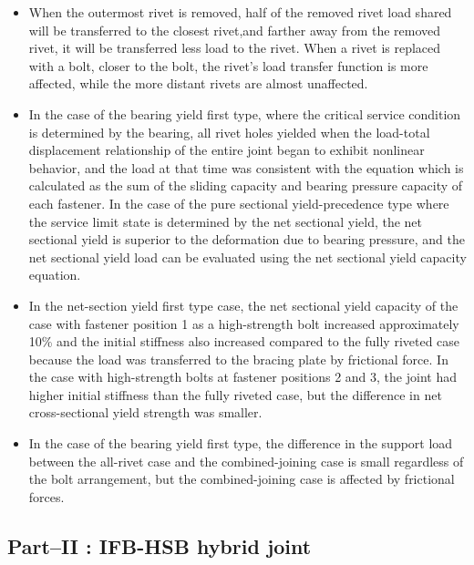 \begin{itemize}

    \item When the outermost rivet is removed, half of the removed rivet load shared will be transferred to the closest rivet,and farther away from the removed rivet, it will be transferred less load to the rivet. When a rivet is replaced with a bolt, closer to the bolt, the rivet's load transfer function is more affected, while the more distant rivets are almost unaffected.

    \item In the case of the bearing yield first type, where the critical service condition is determined by the bearing, all rivet holes yielded when the load-total displacement relationship of the entire joint began to exhibit nonlinear behavior, and the load at that time was consistent with the equation which is calculated as the sum of the sliding capacity and bearing pressure capacity of each fastener. In the case of the pure sectional yield-precedence type where the service limit state is determined by the net sectional yield, the net sectional yield is superior to the deformation due to bearing pressure, and the net sectional yield load can be evaluated using the net sectional yield capacity equation.

    \item  In the net-section yield first type case, the net sectional yield capacity of the case with fastener position 1 as a high-strength bolt increased approximately 10\% and the initial stiffness also increased compared to the fully riveted case because the load was transferred to the bracing plate by frictional force. In the case with high-strength bolts at fastener positions 2 and 3, the joint had higher initial stiffness than the fully riveted case, but the difference in net cross-sectional yield strength was smaller.

    \item In the case of the bearing yield first type, the difference in the support load between the all-rivet case and the combined-joining case is small regardless of the bolt arrangement, but the combined-joining case is affected by frictional forces.

\end{itemize}


\subsection*{Part--\RN{2} : IFB-HSB hybrid joint}

